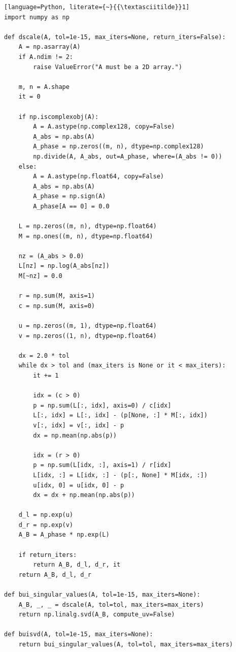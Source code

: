 \documentclass[11pt,a4paper]{article}
\begin{document}
\begin{tcolorbox}[
  enhanced,
  breakable,
  colback=black!1,
  colframe=black!35,
  boxrule=0.6pt,
  arc=2mm,
  left=1.5mm,right=1.5mm,top=1.0mm,bottom=1.0mm,
  title={Python code for BUISVD},
  fonttitle=\bfseries
]
\lstset{
  basicstyle=\ttfamily\small,
  keywordstyle=\bfseries,
  showstringspaces=false,
  breaklines=true,
  columns=fullflexible,
  frame=none
}
\begin{lstlisting}[language=Python, literate={~}{{\textasciitilde}}1]
import numpy as np

def dscale(A, tol=1e-15, max_iters=None, return_iters=False):
    A = np.asarray(A)
    if A.ndim != 2:
        raise ValueError("A must be a 2D array.")

    m, n = A.shape
    it = 0

    if np.iscomplexobj(A):
        A = A.astype(np.complex128, copy=False)
        A_abs = np.abs(A)
        A_phase = np.zeros((m, n), dtype=np.complex128)
        np.divide(A, A_abs, out=A_phase, where=(A_abs != 0))
    else:
        A = A.astype(np.float64, copy=False)
        A_abs = np.abs(A)
        A_phase = np.sign(A)
        A_phase[A == 0] = 0.0

    L = np.zeros((m, n), dtype=np.float64)
    M = np.ones((m, n), dtype=np.float64)

    nz = (A_abs > 0.0)
    L[nz] = np.log(A_abs[nz])
    M[~nz] = 0.0

    r = np.sum(M, axis=1)
    c = np.sum(M, axis=0)

    u = np.zeros((m, 1), dtype=np.float64)
    v = np.zeros((1, n), dtype=np.float64)

    dx = 2.0 * tol
    while dx > tol and (max_iters is None or it < max_iters):
        it += 1

        idx = (c > 0)
        p = np.sum(L[:, idx], axis=0) / c[idx]
        L[:, idx] = L[:, idx] - (p[None, :] * M[:, idx])
        v[:, idx] = v[:, idx] - p
        dx = np.mean(np.abs(p))

        idx = (r > 0)
        p = np.sum(L[idx, :], axis=1) / r[idx]
        L[idx, :] = L[idx, :] - (p[:, None] * M[idx, :])
        u[idx, 0] = u[idx, 0] - p
        dx = dx + np.mean(np.abs(p))

    d_l = np.exp(u)
    d_r = np.exp(v)
    A_B = A_phase * np.exp(L)

    if return_iters:
        return A_B, d_l, d_r, it
    return A_B, d_l, d_r

def bui_singular_values(A, tol=1e-15, max_iters=None):
    A_B, _, _ = dscale(A, tol=tol, max_iters=max_iters)
    return np.linalg.svd(A_B, compute_uv=False)

def buisvd(A, tol=1e-15, max_iters=None):
    return bui_singular_values(A, tol=tol, max_iters=max_iters)
\end{lstlisting}
\end{tcolorbox}
\end{document}
